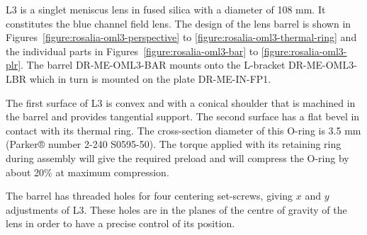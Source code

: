 \documentclass{article}
\begin{document}
L3 is a singlet meniscus lens in fused silica with a diameter of 108 mm. It constitutes the blue channel field lens. The design of the lens barrel is shown in Figures~\ref{figure:rosalia-oml3-perspective} to \ref{figure:rosalia-oml3-thermal-ring} and the individual parts in Figures~\ref{figure:rosalia-oml3-bar} to \ref{figure:rosalia-oml3-plr}. The barrel DR-ME-OML3-BAR mounts onto the L-bracket DR-ME-OML3-LBR which in turn is mounted on the plate DR-ME-IN-FP1.

The first surface of L3 is convex and with a conical shoulder that is machined in the barrel and provides tangential support. The second surface has a flat bevel in contact with its thermal ring. The cross-section diameter of this O-ring is 3.5 mm (Parker® number 2-240 S0595-50). The torque applied with its retaining ring during assembly will give the required preload and will compress the O-ring by about 20\% at maximum compression.

The barrel has threaded holes for four centering set-screws, giving $x$ and $y$ adjustments of L3. These holes are in the planes of the centre of gravity of the lens in order to have a precise control of its position.
\end{document}
